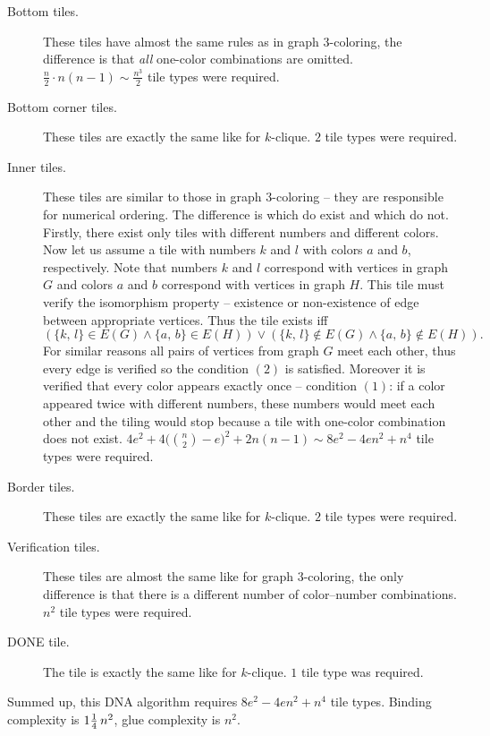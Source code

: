 \begin{description}
	\item[Bottom tiles.] These tiles have almost the same rules as in graph 3-coloring, the difference is that {\em all} one-color combinations are omitted. $\frac{n}{2} \cdot n(n-1) \sim \frac{n^3}{2}$ tile types were required.
	\item[Bottom corner tiles.] These tiles are exactly the same like for $k$-clique. $2$ tile types were required.
	\item[Inner tiles.] These tiles are similar to those in graph $3$-coloring -- they are responsible for numerical ordering. The difference is which do exist and which do not. Firstly, there exist only tiles with different numbers and different colors. Now let us assume a tile with numbers $k$ and $l$ with colors $a$ and $b$, respectively. Note that numbers $k$ and $l$ correspond with vertices in graph $G$ and colors $a$ and $b$ correspond with vertices in graph $H$. This tile must verify the isomorphism property -- existence or non-existence of edge between appropriate vertices. Thus the tile exists iff
	$$(\{k,\,l\} \in E(G) \wedge \{a,\,b\} \in E(H)) \vee (\{k,\,l\} \notin E(G) \wedge \{a,\,b\} \notin E(H)) . $$
	For similar reasons all pairs of vertices from graph $G$ meet each other, thus every edge is verified so the condition $(2)$ is satisfied. Moreover it is verified that every color appears exactly once -- condition $(1)$: if a color appeared twice with different numbers, these numbers would meet each other and the tiling would stop because a tile with one-color combination does not exist. $4e^2 + 4\bigl(\binom{n}{2}-e\bigr)^2 + 2n(n-1) \sim 8e^2 - 4en^2 + n^4$ tile types were required.
	\item[Border tiles.] These tiles are exactly the same like for $k$-clique. $2$ tile types were required.
	\item[Verification tiles.] These tiles are almost the same like for graph $3$-coloring, the only difference is that there is a different number of color--number combinations. $n^2$ tile types were required.
	\item[DONE tile.] The tile is exactly the same like for $k$-clique. $1$ tile type was required.
\end{description}

Summed up, this DNA algorithm requires $8e^2 - 4en^2 + n^4$ tile types. Binding complexity is $1\nicefrac{1}{4}\,n^2$, glue complexity is $n^2$.

